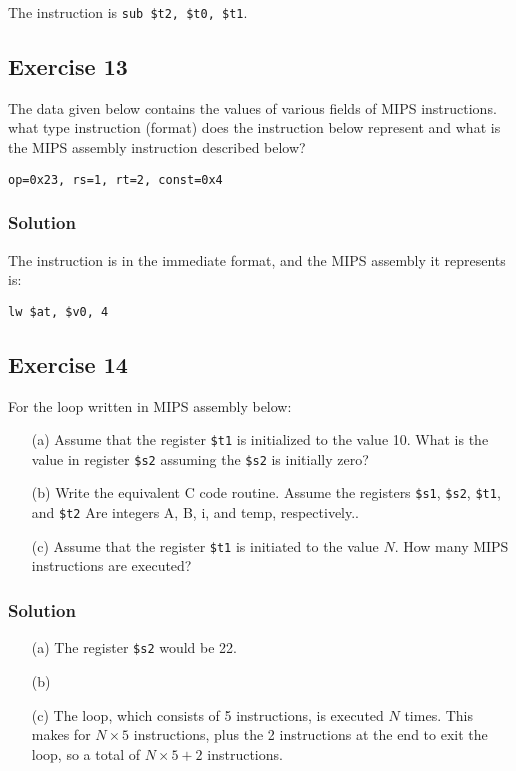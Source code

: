 \documentclass[12pt]{article}
\begin{document}
The instruction is {\tt sub \$t2, \$t0, \$t1}.

\subsection*{Exercise 13}
The data given below contains the values of various fields of MIPS instructions. what type instruction (format) does the instruction below represent and what is the MIPS assembly instruction described below?
\begin{verbatim}
op=0x23, rs=1, rt=2, const=0x4
\end{verbatim}
\subsubsection*{Solution}
The instruction is in the immediate format, and the MIPS assembly it represents is:
\begin{verbatim}
lw $at, $v0, 4
\end{verbatim}

\subsection*{Exercise 14}
For the loop written in MIPS assembly below:
\begin{itemize}
\item[(a)] Assume that the register {\tt\$t1} is initialized to the value 10. What is the value in register {\tt\$s2} assuming the {\tt\$s2} is initially zero?
\item[(b)] Write the equivalent C code routine. Assume the registers {\tt\$s1}, {\tt\$s2}, {\tt\$t1}, and {\tt\$t2} Are integers A, B, i, and temp, respectively..
\item[(c)] Assume that the register {\tt\$t1} is initiated to the value $N$. How many MIPS instructions are executed?
\end{itemize}

\subsubsection*{Solution}
\begin{itemize}
\item[(a)] The register {\tt\$s2} would be 22.
\item[(b)] 
\item[(c)] The loop, which consists of 5 instructions, is executed $N$ times. This makes for $N \times 5$ instructions, plus the 2 instructions at the end to exit the loop, so a total of $\boxed{N \times 5 + 2}$ instructions.
\end{itemize}
\end{document}
